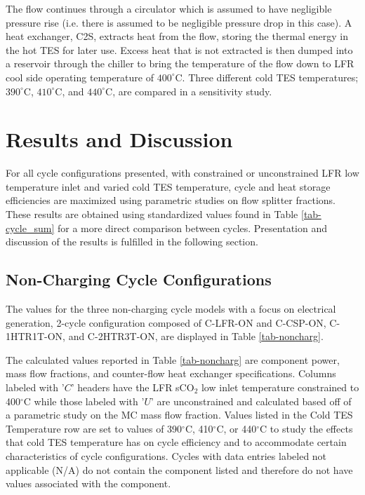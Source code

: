 \begin{paracol}{2}
\linenumbers
\switchcolumn

The flow continues through a circulator which is assumed to have negligible pressure rise (i.e. there is assumed to be negligible pressure drop in this case). A heat exchanger, C2S, extracts heat from the flow, storing the thermal energy in the hot TES for later use. Excess heat that is not extracted is then dumped into a reservoir through the chiller to bring the temperature of the flow down to LFR cool side operating temperature of $400^{\circ}$C. Three different cold TES temperatures; $390^{\circ}$C, $410^{\circ}$C, and $440^{\circ}$C, are compared in a sensitivity study. 



\section{Results and Discussion}

For all cycle configurations presented, with constrained or unconstrained LFR low temperature inlet and varied cold TES temperature, cycle and heat storage efficiencies are maximized using parametric studies on flow splitter fractions. These results are obtained using standardized values found in Table \ref{tab-cycle_sum} for a more direct comparison between cycles. Presentation and discussion of the results is fulfilled in the following section. 

\subsection{Non-Charging Cycle Configurations}

The values for the three non-charging cycle models with a focus on electrical generation, 2-cycle configuration composed of C-LFR-ON and C-CSP-ON, C-1HTR1T-ON, and C-2HTR3T-ON, are displayed in Table \ref{tab-noncharg}. 

The calculated values reported in Table \ref{tab-noncharg} are component power, mass flow fractions, and counter-flow heat exchanger specifications. Columns labeled with '$C$' headers have the LFR sCO$_2$ low inlet temperature constrained to 400$^{\circ}$C while those labeled with '$U$' are unconstrained and calculated based off of a parametric study on the MC mass flow fraction. Values listed in the Cold TES Temperature row are set to values of 390$^{\circ}$C, 410$^{\circ}$C, or 440$^{\circ}$C to study the effects that cold TES temperature has on cycle efficiency and to accommodate certain characteristics of cycle configurations. Cycles with data entries labeled not applicable (N/A) do not contain the component listed and therefore do not have values associated with the component. 
\clearpage 
{}
\end{paracol}
